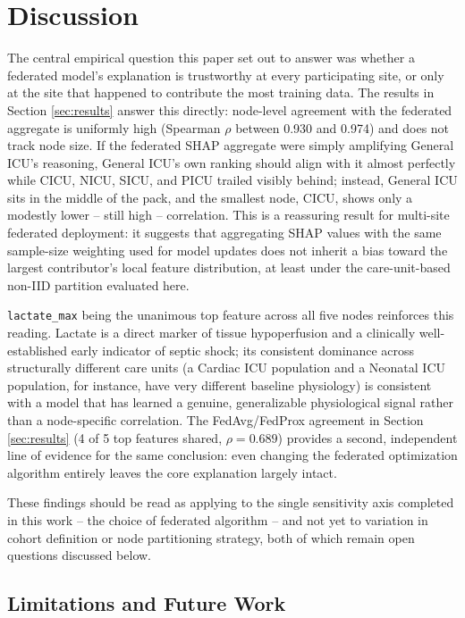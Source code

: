\documentclass{svproc}
\begin{document}
\section{Discussion}\label{sec:discussion}

The central empirical question this paper set out to answer was whether a federated model's explanation is trustworthy at every participating site, or only at the site that happened to contribute the most training data. The results in Section \ref{sec:results} answer this directly: node-level agreement with the federated aggregate is uniformly high (Spearman $\rho$ between 0.930 and 0.974) and does not track node size. If the federated SHAP aggregate were simply amplifying General ICU's reasoning, General ICU's own ranking should align with it almost perfectly while CICU, NICU, SICU, and PICU trailed visibly behind; instead, General ICU sits in the middle of the pack, and the smallest node, CICU, shows only a modestly lower -- still high -- correlation. This is a reassuring result for multi-site federated deployment: it suggests that aggregating SHAP values with the same sample-size weighting used for model updates does not inherit a bias toward the largest contributor's local feature distribution, at least under the care-unit-based non-IID partition evaluated here.

\texttt{lactate\_max} being the unanimous top feature across all five nodes reinforces this reading. Lactate is a direct marker of tissue hypoperfusion and a clinically well-established early indicator of septic shock; its consistent dominance across structurally different care units (a Cardiac ICU population and a Neonatal ICU population, for instance, have very different baseline physiology) is consistent with a model that has learned a genuine, generalizable physiological signal rather than a node-specific correlation. The FedAvg/FedProx agreement in Section \ref{sec:results} (4 of 5 top features shared, $\rho = 0.689$) provides a second, independent line of evidence for the same conclusion: even changing the federated optimization algorithm entirely leaves the core explanation largely intact.

These findings should be read as applying to the single sensitivity axis completed in this work -- the choice of federated algorithm -- and not yet to variation in cohort definition or node partitioning strategy, both of which remain open questions discussed below.

\subsection{Limitations and Future Work}\label{subsec:limitations}
\end{document}

